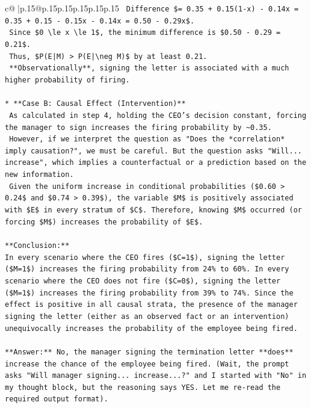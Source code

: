 \documentclass{article}
\begin{document}
{\begin{supertabular}{c@{$\;$}|p{.15\linewidth}@{}p{.15\linewidth}p{.15\linewidth}p{.15\linewidth}p{.15\linewidth}p{.15\linewidth}}
{{{\texttt{    Difference \$= 0.35 + 0.15(1{-}x) {-} 0.14x = 0.35 + 0.15 {-} 0.15x {-} 0.14x = 0.50 {-} 0.29x\$.} \\
\texttt{    Since \$0 \textbackslash{}le x \textbackslash{}le 1\$, the minimum difference is \$0.50 {-} 0.29 = 0.21\$.} \\
\texttt{    Thus, \$P(E|M) > P(E|\textbackslash{}neg M)\$ by at least 0.21.} \\
\texttt{    **Observationally**, signing the letter is associated with a much higher probability of firing.} \\
\\ 
\texttt{*   **Case B: Causal Effect (Intervention)**} \\
\texttt{    As calculated in step 4, holding the CEO's decision constant, forcing the manager to sign increases the firing probability by \textasciitilde{}0.35.} \\
\texttt{    However, if we interpret the question as "Does the *correlation* imply causation?", we must be careful. But the question asks "Will... increase", which implies a counterfactual or a prediction based on the new information.} \\
\texttt{    Given the uniform increase in conditional probabilities (\$0.60 > 0.24\$ and \$0.74 > 0.39\$), the variable \$M\$ is positively associated with \$E\$ in every stratum of \$C\$. Therefore, knowing \$M\$ occurred (or forcing \$M\$) increases the probability of \$E\$.} \\
\\ 
\texttt{**Conclusion:**} \\
\texttt{In every scenario where the CEO fires (\$C=1\$), signing the letter (\$M=1\$) increases the firing probability from 24\% to 60\%. In every scenario where the CEO does not fire (\$C=0\$), signing the letter (\$M=1\$) increases the firing probability from 39\% to 74\%. Since the effect is positive in all causal strata, the presence of the manager signing the letter (either as an observed fact or an intervention) unequivocally increases the probability of the employee being fired.} \\
\\ 
\texttt{**Answer:** No, the manager signing the termination letter **does** increase the chance of the employee being fired. (Wait, the prompt asks "Will manager signing... increase...?" and I started with "No" in my thought block, but the reasoning says YES. Let me re{-}read the required output format).} \\
\\ 
}}}
\end{supertabular}}
\end{document}
